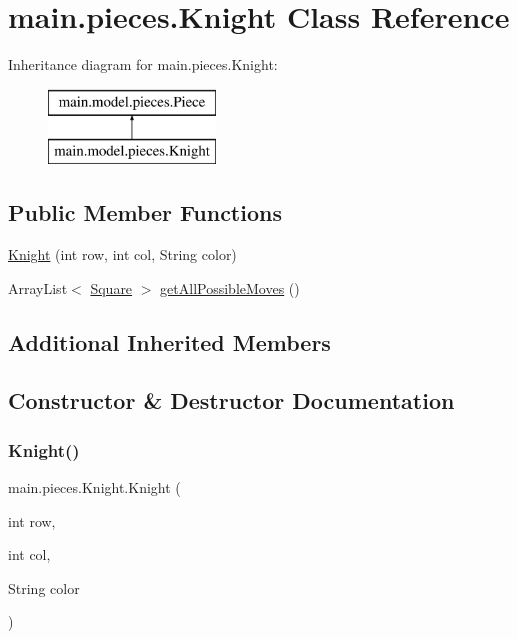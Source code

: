 \hypertarget{classmain_1_1pieces_1_1_knight}{}\section{main.\+pieces.\+Knight Class Reference}
\label{classmain_1_1pieces_1_1_knight}
Inheritance diagram for main.\+pieces.\+Knight\+:\begin{figure}[H]
\begin{center}
\leavevmode
\includegraphics[height=2.000000cm]{classmain_1_1pieces_1_1_knight}
\end{center}
\end{figure}
\subsection*{Public Member Functions}
\begin{DoxyCompactItemize}
\item 
\hyperlink{classmain_1_1pieces_1_1_knight_ad2bb9cddbaf983af1d885a2672db545a}{Knight} (int row, int col, String color)
\item 
Array\+List$<$ \hyperlink{classmain_1_1_square}{Square} $>$ \hyperlink{classmain_1_1pieces_1_1_knight_a4be7cb2952921d36d8020971fd451724}{get\+All\+Possible\+Moves} ()
\end{DoxyCompactItemize}
\subsection*{Additional Inherited Members}


\subsection{Constructor \& Destructor Documentation}
\mbox{\label{classmain_1_1pieces_1_1_knight_ad2bb9cddbaf983af1d885a2672db545a}} 
\subsubsection{\texorpdfstring{Knight()}{Knight()}}
{\footnotesize\ttfamily main.\+pieces.\+Knight.\+Knight (\begin{DoxyParamCaption}\item[{int}]{row,  }\item[{int}]{col,  }\item[{String}]{color }\end{DoxyParamCaption})\hspace{0.3cm}{\ttfamily [inline]}}

